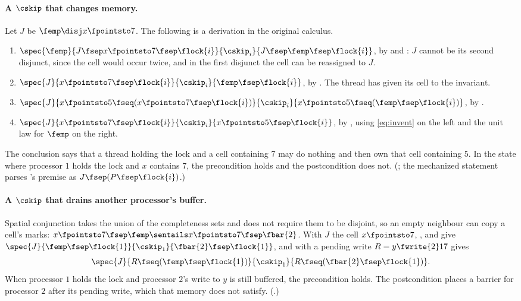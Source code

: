 \paragraph{A $\cskip$ that changes memory.}
Let $J$ be $\femp \disj x \fpointsto 7$. The following is a derivation in
the original calculus.
\begin{enumerate}[nosep]
  \item $\spec{\femp}{J \fsep x \fpointsto 7 \fsep \flock{i}}{\cskip_i}
        {J \fsep \femp \fsep \flock{i}}$,
        by  and : $J$ cannot be its second disjunct, since
        the cell would occur twice, and in the first disjunct the cell can
        be reassigned to $J$.
  \item $\spec{J}{x \fpointsto 7 \fsep \flock{i}}{\cskip_i}
        {\femp \fsep \flock{i}}$, by . The thread has given its
        cell to the invariant.
  \item $\spec{J}{x \fpointsto 5 \fseq (x \fpointsto 7 \fsep \flock{i})}
        {\cskip_i}{x \fpointsto 5 \fseq (\femp \fsep \flock{i})}$,
        by .
  \item $\spec{J}{x \fpointsto 7 \fsep \flock{i}}{\cskip_i}
        {x \fpointsto 5 \fsep \flock{i}}$, by , using
        \eqref{eq:invent} on the left and the unit law for $\femp$ on the
        right.
\end{enumerate}
The conclusion says that a thread holding the lock and a cell containing
$7$ may do nothing and then own that cell containing $5$. In the state
where processor $1$ holds the lock and $x$ contains $7$, the precondition
holds and the postcondition does not.
(; the mechanized statement parses
's premise as $J \fsep (P \fsep \flock{i})$.)

\paragraph{A $\cskip$ that drains another processor's buffer.}
Spatial conjunction takes the union of the completeness sets and does not
require them to be disjoint, so an empty neighbour can copy a cell's marks:
$x \fpointsto 7 \fsep \femp \sentails x \fpointsto 7 \fsep \fbar{2}$. With
$J$ the cell $x \fpointsto 7$, ,  and  give
$\spec{J}{\femp \fsep \flock{1}}{\cskip_1}{\fbar{2} \fsep \flock{1}}$, and
 with a pending write $R = y \fwrite{2} 17$ gives
\[
  \spec{J}{R \fseq (\femp \fsep \flock{1})}{\cskip_1}
          {R \fseq (\fbar{2} \fsep \flock{1})}.
\]
When processor $1$ holds the lock and processor $2$'s write to $y$ is still
buffered, the precondition holds. The postcondition places a barrier for
processor $2$ after its pending write, which that memory does not satisfy.
(.)

